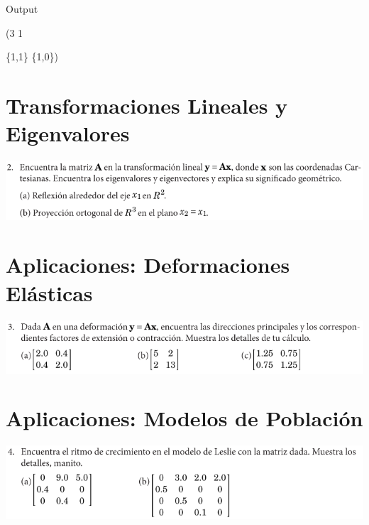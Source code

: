 \documentclass[11pt,a4paper]{article}
\begin{document}
\begin{mmaCell}[addtoindex=1,form=MatrixForm]{Output}

  (3	1

  \{1,1\}	\{1,0\})

\end{mmaCell}

\clearpage

\section{Transformaciones Lineales y Eigenvalores}

\includegraphics[width=1\textwidth]{./img/Capture2.png}

\clearpage

\section{Aplicaciones: Deformaciones Elásticas}

\includegraphics[width=1\textwidth]{./img/Capture3.png}

\clearpage

\section{Aplicaciones: Modelos de Población}

\includegraphics[width=1\textwidth]{./img/Capture4.png}

\clearpage







\clearpage

\end{document}
